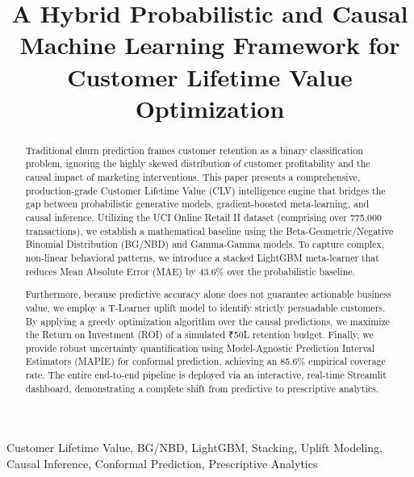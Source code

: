 \documentclass[10pt,conference]{IEEEtran}
\begin{document}
\title{A Hybrid Probabilistic and Causal Machine Learning Framework for Customer Lifetime Value Optimization}

\author{
}

\maketitle

\begin{abstract}
Traditional churn prediction frames customer retention as a binary classification problem, ignoring the highly skewed distribution of customer profitability and the causal impact of marketing interventions. This paper presents a comprehensive, production-grade Customer Lifetime Value (CLV) intelligence engine that bridges the gap between probabilistic generative models, gradient-boosted meta-learning, and causal inference. Utilizing the UCI Online Retail II dataset (comprising over 775,000 transactions), we establish a mathematical baseline using the Beta-Geometric/Negative Binomial Distribution (BG/NBD) and Gamma-Gamma models. To capture complex, non-linear behavioral patterns, we introduce a stacked LightGBM meta-learner that reduces Mean Absolute Error (MAE) by 43.6\% over the probabilistic baseline. 

Furthermore, because predictive accuracy alone does not guarantee actionable business value, we employ a T-Learner uplift model to identify strictly persuadable customers. By applying a greedy optimization algorithm over the causal predictions, we maximize the Return on Investment (ROI) of a simulated ₹50L retention budget. Finally, we provide robust uncertainty quantification using Model-Agnostic Prediction Interval Estimators (MAPIE) for conformal prediction, achieving an 85.6\% empirical coverage rate. The entire end-to-end pipeline is deployed via an interactive, real-time Streamlit dashboard, demonstrating a complete shift from predictive to prescriptive analytics.
\end{abstract}

\begin{IEEEkeywords}
Customer Lifetime Value, BG/NBD, LightGBM, Stacking, Uplift Modeling, Causal Inference, Conformal Prediction, Prescriptive Analytics
\end{IEEEkeywords}
\end{document}
